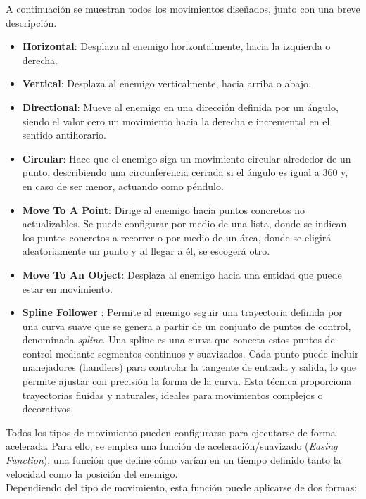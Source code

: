 A continuación se muestran todos los movimientos diseñados, junto con una breve descripción.
\begin{itemize}
  \item \textbf{Horizontal}: Desplaza al enemigo horizontalmente, hacia la izquierda o derecha.
    \item \textbf{Vertical}: Desplaza al enemigo verticalmente, hacia arriba o abajo.
    \item \textbf{Directional}: Mueve al enemigo en una dirección definida por un ángulo, siendo el valor cero un movimiento hacia la derecha e incremental en el sentido antihorario.
    \item \textbf{Circular}: Hace que el enemigo siga un movimiento circular alrededor de un punto, describiendo una circunferencia cerrada si el ángulo es igual a 360 y, en caso de ser menor, actuando como péndulo.
    \item \textbf{Move To A Point}\label{sec:MoveToAPoint}: Dirige al enemigo hacia puntos concretos no actualizables. Se puede configurar por medio de una lista, donde se indican los puntos concretos a recorrer o por medio de un área, donde se eligirá aleatoriamente un punto y al llegar a él, se escogerá otro.
    \item \textbf{Move To An Object}: Desplaza al enemigo hacia una entidad que puede estar en movimiento.
    \item \textbf{Spline Follower} \label{act:splinefollower}: Permite al enemigo seguir una trayectoria definida por una curva suave que se genera a partir de un conjunto de puntos de control, denominada \textit{spline}. Una spline es una curva que conecta estos puntos de control mediante segmentos continuos y suavizados. Cada punto puede incluir manejadores (handlers) para controlar la tangente de entrada y salida, lo que permite ajustar con precisión la forma de la curva. Esta técnica proporciona trayectorias fluidas y naturales, ideales para movimientos complejos o decorativos.

\end{itemize}

Todos los tipos de movimiento pueden configurarse para ejecutarse de forma acelerada. Para ello, se emplea una función de aceleración/suavizado (\textit{Easing Function}), una función que define cómo varían en un tiempo definido tanto la velocidad como la posición del enemigo. \\
Dependiendo del tipo de movimiento, esta función puede aplicarse de dos formas:\\

